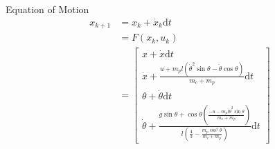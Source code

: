 \documentclass{article}
\theoremstyle{definition} %
\begin{document}
Equation of Motion
\begin{align*}
    x_{k+1} 
    &= x_k + \dot{x}_k\mathrm{d}t\\
    &= F(x_k, u_k) \\
    &= 
    \begin{bmatrix}
        x + \dot{x}\mathrm{d}t\\
        \dot{x} + \frac{u+m_p l\left(\dot{\theta}^2 \sin \theta-\ddot{\theta} \cos \theta\right)}{m_c+m_p}\mathrm{d}t\\
        \theta + \dot{\theta}\mathrm{d}t\\
        \dot{\theta} + \frac{g \sin \theta+\cos \theta\left(\frac{-u-m_p l \dot{\theta}^2 \sin \theta}{m_c+m_p}\right)}{l\left(\frac{4}{3}-\frac{m_p \cos ^2 \theta}{m_c+m_p}\right)}\mathrm{d}t
    \end{bmatrix}
\end{align*}
\end{document}
